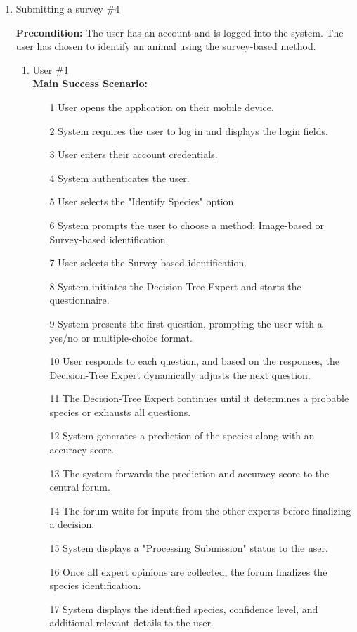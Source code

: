 \documentclass[]{article}
\begin{document}
\begin{enumerate}[{\bf BE1.}]
\item Submitting a survey \#4

    \textbf{Precondition:} The user has an account and is logged into the system. The user has chosen to identify an animal using the survey-based method.

	\begin{enumerate}[{\bf VP1.}]
		\item User \#1 \\
		
            \textbf{Main Success Scenario:}
            \begin{enumerate}
                \item[1] User opens the application on their mobile device.
                \item[2] System requires the user to log in and displays the login fields.
                \item[3] User enters their account credentials.
                \item[4] System authenticates the user.
                \item[5] User selects the "Identify Species" option.
                \item[6] System prompts the user to choose a method: Image-based or Survey-based identification.
                \item[7] User selects the Survey-based identification.
                \item[8] System initiates the Decision-Tree Expert and starts the questionnaire.
                \item[9] System presents the first question, prompting the user with a yes/no or multiple-choice format.
                \item[10] User responds to each question, and based on the responses, the Decision-Tree Expert dynamically adjusts the next question.
                \item[11] The Decision-Tree Expert continues until it determines a probable species or exhausts all questions.
                \item[12] System generates a prediction of the species along with an accuracy score.
                \item[13] The system forwards the prediction and accuracy score to the central forum.
                \item[14] The forum waits for inputs from the other experts before finalizing a decision.
                \item[15] System displays a "Processing Submission" status to the user.
                \item[16] Once all expert opinions are collected, the forum finalizes the species identification.
                \item[17] System displays the identified species, confidence level, and additional relevant details to the user.
            \end{enumerate}


\end{enumerate}
\end{enumerate}
\end{document}

